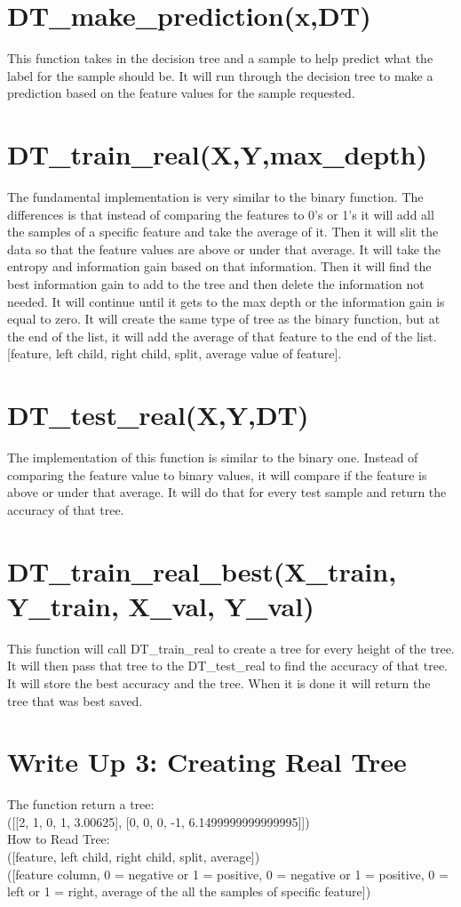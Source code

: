\documentclass{article}
\begin{document}
\section{DT\_make\_prediction(x,DT)}
This function takes in the decision tree and a sample to help predict what the label for the sample should be. It will run through the decision tree to make a prediction based on the feature values for the sample requested.

\section{DT\_train\_real(X,Y,max\_depth)}
The fundamental implementation is very similar to the binary function. The differences is that instead of comparing the features to 0's or 1's it will add all the samples of a specific feature and take the average of it. Then it will slit the data so that the feature values are above or under that average. It will take the entropy and information gain based on that information. Then it will find the best information gain to add to the tree and then delete the information not needed. It will continue until it gets to the max depth or the information gain is equal to zero. It will create the same type of tree as the binary function, but at the end of the list, it will add the average of that feature to the end of the list. 
[feature, left child, right child, split, average value of feature].

\section{DT\_test\_real(X,Y,DT)}
 The implementation of this function is similar to the binary one. Instead of comparing the feature value to binary values, it will compare if the feature is above or under that average. It will do that for every test sample and return the accuracy of that tree.

\section{DT\_train\_real\_best(X\_train, Y\_train, X\_val, Y\_val)}
This function will call DT\_train\_real to create a tree for every height of the tree. It will then pass that tree to the DT\_test\_real to find the accuracy of that tree. It will store the best accuracy and the tree. When it is done it will return the tree that was best saved. 

\section{Write Up 3: Creating Real Tree}
The function return a tree:\\
([[2, 1, 0, 1, 3.00625], [0, 0, 0, -1, 6.1499999999999995]])
\\How to Read Tree: \\ ([feature, left child, right child, split, average])
\\([feature column, 0 = negative or 1 = positive, 0 = negative or 1 = positive, 0 = left or 1 = right, average of the all the samples of specific feature])
\end{document}
